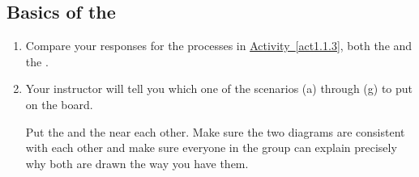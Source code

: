 \WCD

\subsection{Basics of the \EnergyInteractionModel{}}


\begin{FNTenv}
	
\end{FNTenv}

\begin{enumerate}
	\item Compare your responses for the processes in \hyperref[act1.1.3]{Activity~\ref*{act1.1.3}}, both the \TempGraphs{} and the \EnergyDiagrams{}.
	
	\item Your instructor will tell you which one of the scenarios (a) through (g) to put on the board.
		
	Put the \TempGraph{} and the \EnergyDiagram{} near each other. Make sure the two diagrams are consistent with each other and make sure everyone in the group can explain precisely why both are drawn the way you have them.

\WCD

\end{enumerate}
